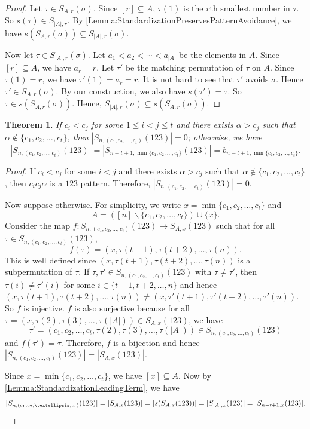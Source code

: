 \documentclass[11pt]{article}
\newtheorem{theorem}{Theorem}[section]
\theoremstyle{definition}
\numberwithin{equation}{section}
\begin{document}
\begin{proof}
Let $\tau\in S_{A,r}(\sigma)$. Since $[r]\subseteq A$, $\tau(1)$ is the $r$th smallest number in $\tau$. So $s(\tau)\in S_{|A|,r}$. By \cref{Lemma:StandardizationPreservesPatternAvoidance}, we have $s(S_{A,r}(\sigma))\subseteq S_{|A|,r}(\sigma)$.

Now let $\tau\in S_{|A|,r}(\sigma)$. Let $a_1<a_2<\cdots<a_{|A|}$ be the elements in $A$. Since $[r]\subseteq A$, we have $a_r=r$. Let $\tau'$ be the matching permutation of $\tau$ on $A$. Since $\tau(1)=r$, we have $\tau'(1)=a_r=r$. It is not hard to see that $\tau'$ avoids $\sigma$. Hence $\tau'\in S_{A,r}(\sigma)$. By our construction, we also have $s(\tau')=\tau$. So $\tau\in s(S_{A,r}(\sigma))$. Hence, $S_{|A|,r}(\sigma)\subseteq s(S_{A,r}(\sigma))$.
\end{proof}
\begin{theorem}\label{Theorem:123LeadingTerms}
    If $c_i<c_j$ for some $1\leq i<j\leq t$ and there exists $\alpha>c_j$ such that $\alpha\notin\{c_1,c_2,\ldots,c_t\}$, then $|S_{n,(c_1,c_2,\ldots,c_t)}(123)|=0$; otherwise, we have
    \[
    |S_{n,(c_1,c_2,\ldots,c_t)}(123)|=|S_{n-t+1,\min\{c_1,c_2,\ldots,c_t\}}(123)|=b_{n-t+1,\min\{c_1,c_2,\ldots,c_t\}}.
    \]
\end{theorem}
\begin{proof}
    If $c_i<c_j$ for some $i<j$ and there exists $\alpha>c_j$ such that $\alpha\notin\{c_1,c_2,\ldots,c_t\}$, then $c_ic_j\alpha$ is a $123$ pattern. Therefore, $|S_{n,(c_1,c_2,\ldots,c_t)}(123)|=0$.

    Now suppose otherwise. For simplicity, we write $x=\min\{c_1,c_2,\ldots,c_t\}$ and \[A=([n]\backslash\{c_1,c_2,\ldots,c_t\})\cup\{x\}.\] Consider the map $f:S_{n,(c_1,c_2,\ldots,c_t)}(123)\to S_{A,x}(123)$ such that for all $\tau\in S_{n,(c_1,c_2,\ldots,c_t)}(123)$,
    \[
    f(\tau)=(x,\tau(t+1),\tau(t+2),\ldots,\tau(n)).
    \]
    This is well defined since $(x,\tau(t+1),\tau(t+2),\ldots,\tau(n))$ is a subpermutation of $\tau$. If $\tau,\tau'\in S_{n,(c_1,c_2,\ldots,c_t)}(123)$ with $\tau\neq\tau'$, then $\tau(i)\neq \tau'(i)$ for some $i\in\{t+1,t+2,\ldots,n\}$ and hence $(x,\tau(t+1),\tau(t+2),\ldots,\tau(n))\neq (x,\tau'(t+1),\tau'(t+2),\ldots,\tau'(n))$. So $f$ is injective. $f$ is also surjective because for all $\tau=(x,\tau(2),\tau(3),\ldots,\tau(|A|))\in S_{A,x}(123)$, we have \[\tau'=(c_1,c_2,\ldots,c_t,\tau(2),\tau(3),\ldots,\tau(|A|))\in S_{n,(c_1,c_2,\ldots,c_t)}(123)\] and $f(\tau')=\tau$. Therefore, $f$ is a bijection and hence $|S_{n,(c_1,c_2,\ldots,c_t)}(123)|=|S_{A,x}(123)|$.

    Since $x=\min\{c_1,c_2,\ldots,c_t\}$, we have $[x]\subseteq A$. Now by \cref{Lemma:StandardizationLeadingTerm}, we have
    \[
    |S_{n,(c_1,c_2,\ldots,c_t)}(123)|=|S_{A,x}(123)|=|s(S_{A,x}(123))|=|S_{|A|,x}(123)|=|S_{n-t+1,x}(123)|.\qedhere
    \]
    \end{proof}
\end{document}
